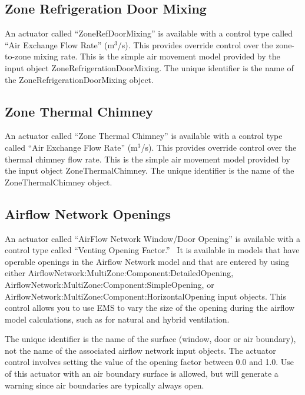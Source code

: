 \subsection{Zone Refrigeration Door Mixing}\label{zone-refrigeration-door-mixing}

An actuator called ``ZoneRefDoorMixing'' is available with a control type called ``Air Exchange Flow Rate'' (m\(^{3}\)/s). This provides override control over the zone-to-zone mixing rate. This is the simple air movement model provided by the input object ZoneRefrigerationDoorMixing. The unique identifier is the name of the ZoneRefrigerationDoorMixing object.


\subsection{Zone Thermal Chimney}\label{zone-thermal-chimney}

An actuator called ``Zone Thermal Chimney'' is available with a control type called ``Air Exchange Flow Rate'' (m\(^{3}\)/s). This provides override control over the thermal chimney flow rate. This is the simple air movement model provided by the input object ZoneThermalChimney. The unique identifier is the name of the ZoneThermalChimney object.

\subsection{Airflow Network Openings}\label{airflow-network-openings}

An actuator called ``AirFlow Network Window/Door Opening'' is available with a control type called ``Venting Opening Factor.''~ It is available in models that have operable openings in the Airflow Network model and that are entered by using either AirflowNetwork:MultiZone:Component:DetailedOpening, AirflowNetwork:MultiZone:Component:SimpleOpening, or AirflowNetwork:MultiZone:Component:HorizontalOpening input objects. This control allows you to use EMS to vary the size of the opening during the airflow model calculations, such as for natural and hybrid ventilation.

The unique identifier is the name of the surface (window, door or air boundary), not the name of the associated airflow network input objects. The actuator control involves setting the value of the opening factor between 0.0 and 1.0. Use of this actuator with an air boundary surface is allowed, but will generate a warning since air boundaries are typically always open.
